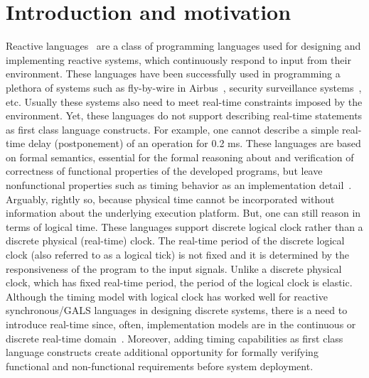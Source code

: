 \section{Introduction and motivation}
\label{sec:intr-motiv}

Reactive languages~\cite{gber931,amal10} are a class of programming
languages used for designing and implementing reactive systems, which
continuously respond to input from their environment. These languages
have been successfully used in programming a plethora of systems such as
fly-by-wire in Airbus~\cite{eairbus}, security surveillance
systems~\cite{amal121}, etc. Usually these systems also need to meet
real-time constraints imposed by the environment. Yet, these languages
do not support describing real-time statements as first class language
constructs.  For example, one cannot describe a simple real-time delay
(postponement) of an operation for 0.2 ms. These languages are based on
formal semantics, essential for the formal reasoning about and
verification of correctness of functional properties of the developed
programs, but leave nonfunctional properties such as timing behavior as
an implementation detail~\cite{boldt07}. Arguably, rightly so, because
physical time cannot be incorporated without information about the
underlying execution platform.  But, one can still reason in terms of
logical time. These languages support discrete logical clock rather than
a discrete physical (real-time) clock. The real-time period of the
discrete logical clock (also referred to as a logical tick) is not fixed
and it is determined by the responsiveness of the program to the input
signals. Unlike a discrete physical clock, which has fixed real-time
period, the period of the logical clock is elastic. Although the timing
model with logical clock has worked well for reactive synchronous/GALS
languages in designing discrete systems, there is a need to introduce
real-time since, often, implementation models are in the continuous or
discrete real-time domain~\cite{DBLP:journals/pieee/SifakisTY03}.
Moreover, adding timing capabilities as first class language constructs
create additional opportunity for formally verifying functional and
non-functional requirements before system deployment.



